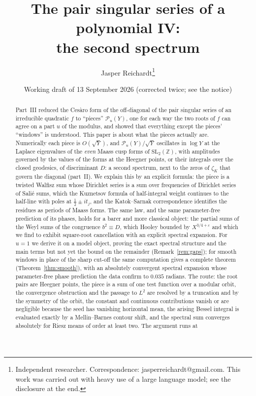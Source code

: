 \documentclass[11pt,a4paper]{article}
\title{The pair singular series of a polynomial IV:\\ the second spectrum}
\author{Jasper Reichardt\thanks{Independent researcher. Correspondence: jasperreichardt@gmail.com. This work was
carried out with heavy use of a large language model; see the disclosure at the end.}}
\date{Working draft of 13 September 2026 (corrected twice; see the notice)}
\theoremstyle{remark}\newtheorem{remark}[theorem]{Remark}
\newcommand{\Z}{\mathbb Z}\newcommand{\R}{\mathbb R}\newcommand{\Q}{\mathbb Q}\newcommand{\C}{\mathbb C}
\begin{document}
\maketitle

\begin{abstract}
Part~III reduced the Ces\`aro form of the off-diagonal of the pair singular series of an irreducible quadratic $f$
to ``pieces'' $\mathcal P_u(Y)$, one for each way the two roots of $f$ can agree on a part $u$ of the modulus, and
showed that everything except the pieces' ``windows'' is understood. This paper is about what the pieces actually
are. Numerically each piece is $O(\sqrt Y)$, and $\mathcal P_u(Y)/\sqrt Y$ oscillates in $\log Y$ at the Laplace
eigenvalues of the \emph{even} Maass cusp forms of $\mathrm{SL}_2(\Z)$, with amplitudes governed by the values of
the forms at the Heegner points, or their integrals over the closed geodesics, of discriminant $D$: a second
spectrum, next to the zeros of $\zeta_K$ that govern the diagonal (part~II). We explain this by an explicit
formula: the piece is a twisted Walfisz sum whose Dirichlet series is a sum over frequencies of Dirichlet series
of Sali\'e sums, which the Kuznetsov formula of half-integral weight continues to the half-line with poles at
$\tfrac12\pm it_j$, and the Katok--Sarnak correspondence identifies the residues as periods of Maass forms. The same law, and the same parameter-free
prediction of its phases, holds for a barer and more classical object: the partial sums of the Weyl sums of the
congruence $b^2\equiv D$, which Hooley bounded by $X^{3/4+\varepsilon}$ and which we find to exhibit square-root
cancellation with an explicit spectral expansion. For $u=1$ we derive it on a model object, proving the exact spectral
structure and the main terms but not yet the bound on the remainder (Remark~\ref{rem:gaps}); for smooth windows in
place of the sharp cut-off the same computation gives a complete theorem (Theorem~\ref{thm:smooth}), with an
absolutely convergent spectral expansion whose parameter-free phase prediction the data confirm to $0.035$ radians.
The route: the root pairs are Heegner points, the piece is a
sum of one test function over a modular orbit, the convergence obstruction and the passage to $L^2$ are resolved by a
truncation and by the symmetry of the orbit, the constant and continuous contributions vanish or are negligible
because the seed has vanishing horizontal mean, the arising Bessel integral is evaluated exactly by a Mellin--Barnes
contour shift, and the spectral sum converges absolutely for Riesz means of order at least two. The argument runs at

\end{abstract}
\end{document}
